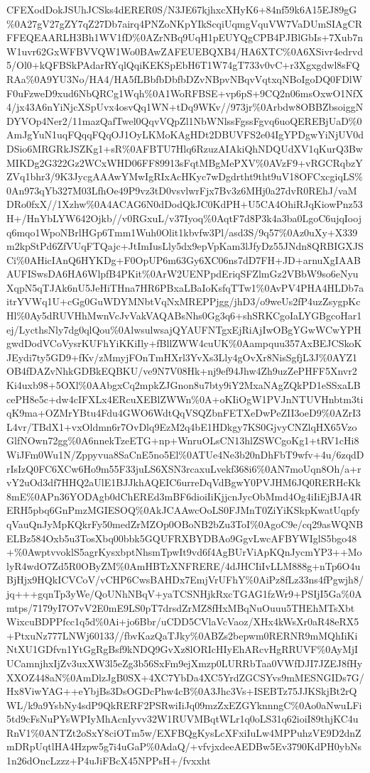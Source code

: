 \documentclass[]{article}
\begin{document}
CFEXodDokJSUhJCSks4dERER0S/N3JE67kjhxcXHyK6+84nf59k6A15EJ89gG\%0A27gV27gZY7qZ27Db7airq4PNZoNKpYIkScqiUqmgVquVW7VaDUmSIAgCRFFEQEAARLH3Bh1WV1fD\%0AZrNBq9UqH1pEUYQgCPB4PJBlGbIs+7Xub7nW1uvr62GxWFBVVQW1Wo0BAwZAFEUEBQXB4/HA6XTC\%0A6XSivr4edrvd5/Ol0+kQFBSkPAdarRYqlQqiKEKSpEbH6T1W74gT733v0vC+r3Xgxgdwl8sFQRAa\%0A9YU3No/HA4/HA5fLBbfbDbfbDZvNBpvNBqvVqtxqNBoIgoDQ0FDlWF0uFzweD9xud6NbQRCg1Wqh\%0A1WoRFBSE+vp6pS+9CQ2n06msOxwO1NfX4/jx43A6nYiNjcXSpUvx4osvQq1WN+tDq9WKv//973jr\%0Arbdw8OBBZbsoiggNDYVOp4Ner2/11mazQafTwel0QqvVQpZl1NbWNlssFgssFgvq6uoQEREBjUaD\%0AmJgYuN1uqFQqqFQqOJ1OyLKMoKAgHDt2DBUVFS2e04IgYPDgwYiNjUV0dDSio6MRGRkJSZKg1+sR\%0AFBTU7Hlq6RzuzAIAkiQhNDQUdXV1qKurQ3BwMIKDg2G322Gz2WCxWHD06FF89913sFqtMBgMePXV\%0AVzF9+vRGCRqbzYZVq1bhr3/9K3JycgAAAwYMwIgRIxAcHKyc7wDgdrtht9tht9uV18OFCxcgiqLS\%0An973qYb327M03LfhOe49P9vz3tD0vsvlwrFjx7Bv3z6MHj0a27dvR0REhJ/vaMDRo0fxX//1Xzhw\%0A4ACAG6N0dDodQkJC0KdPH+U5CA4OhiRJqKiowPnz53H+/HnYbLYW642Ojkb//v0RGxuL/v37Iyoq\%0AqtF7d8P3k4a3ba0LgoC6ujqIoojq6mqo1WpoNBrlHGp6Tmm1Wuh0Olit1kbvfw3Pl/asd3S/9q57\%0Az0uXy+X339m2kpStPd6ZfVUqFTQajc+JtImIusLly5dx9epVpKam3lJfyDz55JNdn8QRBIGXJSCi\%0AHicIAnQ6HYKDg+F0OpUP6m63Gy6XC06ns7dD7FH+JD+arnuXgIAABAUFISwsDA6HA6WlpfB4PKit\%0ArW2UENPpdEriqSFZlmGz2VBbW9so6eNyuXqpN5qTJAk6nU5JeHiTHna7HR6PBxaLBaIoKsfqTTw1\%0AvPV4PHA4HLDb7aitrYVWq1U+cGg0GuWDYMNbtVqNxMREPPjgg/jhD3/o9weUs2fP4uzZsygpKcHl\%0Ay5dRUVHhMwnVcJvVakVAQABsNhs0Gg3q6+shSRKCgoIaLYGBgcoHar1ej/LycthsNly7dg0qlQou\%0AlwsulwsajQYAUFNTgxEjRiAjIwOBgYGwWCwYPHgwdDodVCoVysrKUFhYiKKiIly+fBllZWW4cuUK\%0Aampquu357AxBEJCSkoKJEydi7ty5GD9+fKv/zMmyjFOnTmHXrl3YvXs3Lly4gOvXr8NisSgfjL3J\%0AYZ1OB4fDAZvNhkGDBkEQBKU/ve9N7V08Hk+nj9ef94Jhw4Zh9uzZePHFF5Xnvr2Ki4uxb98+5OXl\%0AAbgxCq2mpkZJGnon8u7bty9iY2MxaNAgZQkPD1eSSxaLBcePH8e5c+dw4cIFXLx4ERcuXEBlZWWn\%0A+oKIiOgW1PVJnNTUVHnbtm3tiqK9ma+OZMrYBtu4Fdu4GWO6WdtQqVSQZbnFETXeDwPeZII3oeD9\%0AZrI3L4vr/TBdX1+vxOldmn6r7OvDlq9EzM2q4bE1HDkgy7KS0GjvyCNZlqHX65VzoGlfNOwn72gg\%0A6nnekTzeETG+np+WnruOLsCN13hlZSWCgoKg1+tRV1cHi8WiJFm0Wu1N/Zppyvua8SaCnE5no5El\%0ATUe4Ne3b20nDhFbT9wfv+4u/6zqdDrIsIzQ0FC6XCw6Ho9m55F33juLS6XSN3rcaxuLvekf368i6\%0AN7moUqn8Oh/a+rvY2uOd3df7HHQ2aUlE1BJJkhAQEIC6urreDqVdBgwY0PVJHM6JQ0RERHcKk8mE\%0APn36YODAgb0dChEREd3mBF6dioiIiKjjcnJycObMmd4Og4iIiEjBJA4RERH5pbq6GnPmzMGIESOQ\%0AkJCAAwcOoLS0FJMnT0ZiYiKSkpKwatUqpfyqVauQnJyMpKQkrFy50medZrMZOp0OBoNB2bZu3ToI\%0AgoC9e/cq29asWQNBELBz584Oxb5u3TosXbq00bbk5GQUFRXBYDBAo9GgvLwcAFBYWIglS5bgo48+\%0AwptvvoklS5agrKysxbptNhsmTpwIt9vd6f4AgBUrViApKQnJycmYP3++MolyR4wdO7Zd5R0OByZM\%0AmHBTzXNFRERE/4dJHCIiIvLLM888g+nTp6O4uBjHjx9HQkICVCoV/vCHP6CwsBAHDx7EmjVrUFhY\%0AiPz8fLz33ns4fPgwjh8/jq+++gqnTp3yWe/QoUNhNBqV+yaTCSNHjkRxcTGAG1fzWr9+PSIjI5Ga\%0Amtps/7179yI7O7vV2E0mE9LS0pT7drsdZrMZ8fHxMBqNuOuuu5THEhMTsXbtWixcuBDPPfcc1q5d\%0Ai+jo6Bbr/uCDD5CVlaVcVaoz/XHx4kWsXr0aR48eRX5+PtxuNz777LNWj60133//fbvKazQaTJky\%0ABZs2bepwm0RERNR9mMQhIiKiNtXU1GDfvn1YtGgRgBsf9kNDQ9GvXz8lORIcHIyEhARcvHgRRUVF\%0AyMjIUCamnjhxIjZv3uxXW3l5eZg3b56SxFm9ejXmzp0LURRbTaa0VWfDJI7JZEJ8fHyXXOZ448aN\%0AmDlzJgB0SX+4XC7YbDa4XC5YrdZGCSYvs9mMESNGIDs7G/Hx8ViwYAG++eYbjBs3DsOGDcPhw4cB\%0A3Jhc3Vs+ISEBTz75JJKSkjBt2rQWL/k9a9YsbNy4sdP9QkRERF2PSRwiIiJq09mzZxEZGYknnngC\%0Ao0aNwuLFi5td9cFsNuPYsWPIyMhAcnIyvv32W1RUVMBqtWLr1q0oLS31q62ioiI89thjKC4uRnV1\%0ANTZt2oSxY8ciOTm5w/EXFBQgKysLcXFxiIuLw4MPPuhzVE9D2dnZmDRpUqtlHA4Hzpw5g7i4uGaP\%0AdaQ/+vfvjxdeeAEDBw5Ev3790KdPH0ybNs1n26dOncLzzz+P4uJiFBcX45NPPsH+/fvxxht
\end{document}
